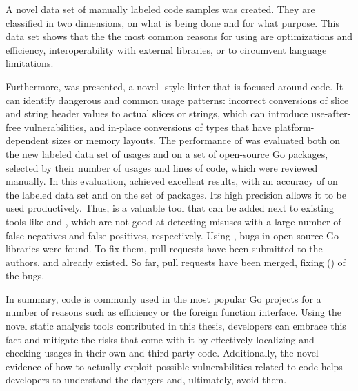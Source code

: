 A novel data set of \numberLabeledCodeSnippets{} manually labeled \unsafe{} code samples was created.
They are classified in two dimensions, on what is being done and for what purpose.
This data set shows that the the most common reasons for using \unsafe{} are optimizations and efficiency,
interoperability with external libraries, or to circumvent language limitations.

Furthermore, \toolSafer{} was presented, a novel \toolVet{}-style linter that is focused around \unsafe{} code.
It can identify  dangerous and common usage patterns: incorrect conversions of slice and string header
values to actual slices or strings, which can introduce use-after-free vulnerabilities, and in-place conversions of
types that have platform-dependent sizes or memory layouts.
The performance of \toolSafer{} was evaluated both on the new labeled data set of \unsafe{} usages and on a set of
open-source Go packages, selected by their number of \unsafe{} usages and lines of code, which were reviewed manually.
In this evaluation, \toolSafer{} achieved excellent results, with an accuracy of
\goSaferEvaluationDatasetGosaferAccuracy{} on the labeled data set and \goSaferEvaluationPackagesGosaferAccuracy{} on
the set of packages.
Its high precision allows it to be used productively.
Thus, \toolSafer{} is a valuable tool that can be added next to existing tools like \toolVet{} and \toolGosec{}, which
are not good at detecting \unsafe{} misuses with a large number of false negatives and false positives, respectively.
Using \toolSafer{}, \numberBugsFixed{} bugs in open-source Go libraries were found.
To fix them, \numberPRs{} pull requests have been submitted to the authors, and  already existed.
So far, \numberPRsMerged{} pull requests have been merged, fixing \numberBugsMerged{} (\fractionBugsMerged{}) of the
bugs.

In summary, \unsafe{} code is commonly used in the most popular Go projects for a number of reasons such as efficiency
or the foreign function interface.
Using the novel static analysis tools contributed in this thesis, developers can embrace this fact and mitigate the
risks that come with it by effectively localizing and checking \unsafe{} usages in their own and third-party code.
Additionally, the novel evidence of how to actually exploit possible vulnerabilities related to \unsafe{} code helps
developers to understand the dangers and, ultimately, avoid them.
